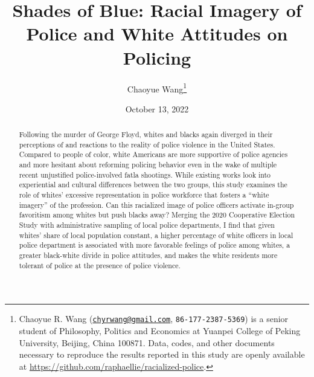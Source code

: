 \documentclass[
  12pt,
]{article}
\title{Shades of Blue: Racial Imagery of Police and White Attitudes on
Policing}
\author{Chaoyue Wang\footnote{Chaoyue R. Wang
  (\href{mailto:chyrwang@gmail.com}{\nolinkurl{chyrwang@gmail.com}},
  \texttt{86-177-2387-5369}) is a senior student of Philosophy, Politics
  and Economics at Yuanpei College of Peking University, Beijing, China
  100871. Data, codes, and other documents necessary to reproduce the
  results reported in this study are openly available at
  \url{https://github.com/raphaellie/racialized-police}.}}
\date{October 13, 2022}
\begin{document}

\maketitle


\thispagestyle{empty}

\begin{abstract} 
\noindent %
Following the murder of George Floyd, whites and blacks again diverged
in their perceptions of and reactions to the reality of police violence
in the United States. Compared to people of color, white Americans are
more supportive of police agencies and more hesitant about reforming
policing behavior even in the wake of multiple recent unjustified
police-involved fatla shootings. While existing works look into
experiential and cultural differences between the two groups, this study
examines the role of whites' excessive representation in police
workforce that fosters a ``white imagery'' of the profession. Can this
racialized image of police officers activate in-group favoritism among
whites but push blacks away? Merging the 2020 Cooperative Election Study
with administrative sampling of local police departments, I find that
given whites' share of local population constant, a higher percentage of
white officers in local police department is associated with more
favorable feelings of police among whites, a greater black-white divide
in police attitudes, and makes the white residents more tolerant of
police at the presence of police violence.
\end{abstract}

\begin{quote}
\end{quote}

\newpage \clearpage {}\captionsetup{labelfont = bf, font = small}




\ifdefined\Shaded\renewenvironment{Shaded}{\begin{tcolorbox}[borderline west={3pt}{0pt}{shadecolor}, boxrule=0pt, interior hidden, breakable, sharp corners, enhanced, frame hidden]}{\end{tcolorbox}}\fi
\end{document}
